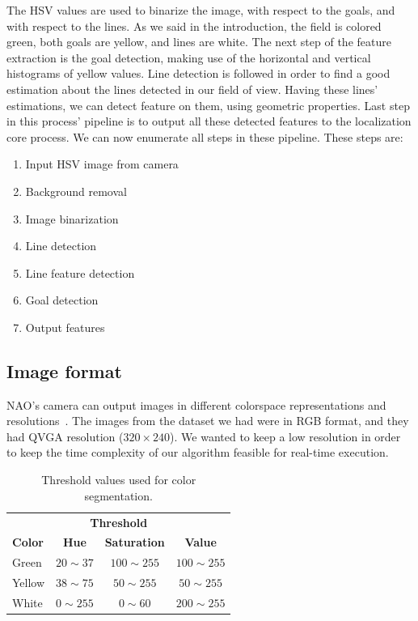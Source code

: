 \documentclass[	DIV=calc,%
							paper=a4,%
							fontsize=9pt,%
							twocolumn]{scrartcl}	 					%
\begin{document}
The HSV values are used to binarize the image, with respect to the goals, and with respect to the lines. As we said in the introduction, the field is colored green, both goals are yellow, and lines are white. The next step of the feature extraction is the goal detection, making use of the horizontal and vertical histograms of yellow values. Line detection is followed in order to find a good estimation about the lines detected in our field of view. Having these lines' estimations, we can detect feature on them, using geometric properties. Last step in this process' pipeline is to output all these detected features to the localization core process. We can now enumerate all steps in these pipeline. These steps are:
\begin{enumerate}
\item Input HSV image from camera
\item Background removal
\item Image binarization
\item Line detection
\item Line feature detection
\item Goal detection
\item Output features
\end{enumerate}

\subsection{Image format}
NAO's camera can output images in different colorspace representations and resolutions~\cite{NaoCam}. The images from the dataset we had were in RGB format, and they had QVGA resolution ($320 \times 240$). We wanted to keep a low resolution in order to keep the time complexity of our algorithm feasible for real-time execution. 

\begin{table}
\begin{center}
\caption{Threshold values used for color segmentation.}
\label{thresholdHSV}
\begin{tabular}{lccc}
\toprule
\multicolumn{4}{c}{\textbf{Threshold}} \\
\cmidrule(r){2-4}
\textbf{Color}   & \textbf{Hue} & \textbf{Saturation} & \textbf{Value} \\
\midrule
Green      & $20 \sim 37$    & $100 \sim 255$    & $100 \sim 255$    \\
Yellow      & $38 \sim 75$    & $50 \sim 255$    & $50 \sim 255$    \\
White     & $0 \sim 255$    & $0 \sim 60$    & $200 \sim 255$    \\
\bottomrule
\end{tabular}
\end{center}
\end{table}
\end{document}
